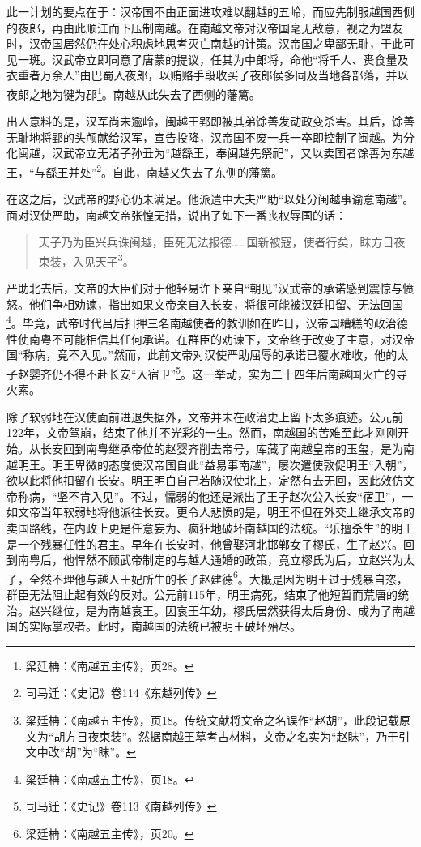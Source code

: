 此一计划的要点在于：汉帝国不由正面进攻难以翻越的五岭，而应先制服越国西侧的夜郎，再由此顺江而下压制南越。在南越文帝对汉帝国毫无敌意，视之为盟友时，汉帝国居然仍在处心积虑地思考灭亡南越的计策。汉帝国之卑鄙无耻，于此可见一斑。汉武帝立即同意了唐蒙的提议，任其为中郎将，命他“将千人、赉食量及衣重者万余人”由巴蜀入夜郎，以贿赂手段收买了夜郎侯多同及当地各部落，并以夜郎之地为犍为郡\footnote{ 梁廷柟：《南越五主传》，页28。}。南越从此失去了西侧的藩篱。

出人意料的是，汉军尚未逾岭，闽越王郢即被其弟馀善发动政变杀害。其后，馀善无耻地将郢的头颅献给汉军，宣告投降，汉帝国不废一兵一卒即控制了闽越。为分化闽越，汉武帝立无渚子孙丑为“越繇王，奉闽越先祭祀”，又以卖国者馀善为东越王，“与繇王并处”\footnote{ 司马迁：《史记》卷114《东越列传》}。自此，南越又失去了东侧的藩篱。

在这之后，汉武帝的野心仍未满足。他派遣中大夫严助“以处分闽越事谕意南越”。面对汉使严助，南越文帝张惶无措，说出了如下一番丧权辱国的话：

\begin{quote}
天子乃为臣兴兵诛闽越，臣死无法报德……国新被寇，使者行矣，眜方日夜束装，入见天子\footnote{梁廷柟：《南越五主传》，页18。传统文献将文帝之名误作“赵胡”，此段记载原文为“胡方日夜束装”。然据南越王墓考古材料，文帝之名实为“赵眜”，乃于引文中改“胡”为“眜”。}。
\end{quote}

严助北去后，文帝的大臣们对于他轻易许下亲自“朝见”汉武帝的承诺感到震惊与愤怒。他们争相劝谏，指出如果文帝亲自入长安，将很可能被汉廷扣留、无法回国\footnote{梁廷柟：《南越五主传》，页18。}。毕竟，武帝时代吕后扣押三名南越使者的教训如在昨日，汉帝国糟糕的政治德性使南粤不可能相信其任何承诺。在群臣的劝谏下，文帝终于改变了主意，对汉帝国“称病，竟不入见。”然而，此前文帝对汉使严助屈辱的承诺已覆水难收，他的太子赵婴齐仍不得不赴长安“入宿卫”\footnote{司马迁：《史记》卷113《南越列传》}。这一举动，实为二十四年后南越国灭亡的导火索。

除了软弱地在汉使面前进退失据外，文帝并未在政治史上留下太多痕迹。公元前122年，文帝驾崩，结束了他并不光彩的一生。然而，南越国的苦难至此才刚刚开始。从长安回到南粤继承帝位的赵婴齐削去帝号，库藏了南越皇帝的玉玺，是为南越明王。明王卑微的态度使汉帝国自此“益易事南越”，屡次遣使敦促明王“入朝”，欲以此将他扣留在长安。明王明白自己若随汉使北上，定然有去无回，因此效仿文帝称病，“坚不肯入见”。不过，懦弱的他还是派出了王子赵次公入长安“宿卫”，一如文帝当年软弱地将他派往长安。更令人悲愤的是，明王不但在外交上继承文帝的卖国路线，在内政上更是任意妄为、疯狂地破坏南越国的法统。“乐擅杀生”的明王是一个残暴任性的君主。早年在长安时，他曾娶河北邯郸女子樛氏，生子赵兴。回到南粤后，他悍然不顾武帝制定的与越人通婚的政策，竟立樛氏为后，立赵兴为太子，全然不理他与越人王妃所生的长子赵建德\footnote{梁廷柟：《南越五主传》，页20。}。大概是因为明王过于残暴自恣，群臣无法阻止起有效的反对。公元前115年，明王病死，结束了他短暂而荒唐的统治。赵兴继位，是为南越哀王。因哀王年幼，樛氏居然获得太后身份、成为了南越国的实际掌权者。此时，南越国的法统已被明王破坏殆尽。

